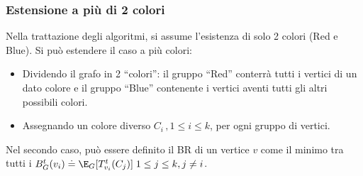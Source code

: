         \subsubsection*{Estensione a più di 2 colori} 
        Nella trattazione degli algoritmi, si assume l'esistenza di solo 2 colori (Red e Blue). Si può estendere il caso a più colori:
        \begin{itemize}
            \item Dividendo il grafo in 2 ``colori'': il gruppo ``Red'' conterrà tutti i vertici di un dato colore 
            e il gruppo ``Blue'' contenente i vertici aventi tutti gli altri possibili colori.
            \item Assegnando un colore diverso $C_i \, ,1 \le i \le k$, per ogni gruppo di vertici. 
        \end{itemize}
        Nel secondo caso, può essere definito il BR di un vertice $v$ come il minimo tra 
        tutti i $B_G^{t}(v_i) \doteq \E_G[T_{v_i}^t({C}_j)] \; 1 \le j \le k ,j \not = i  $. 

